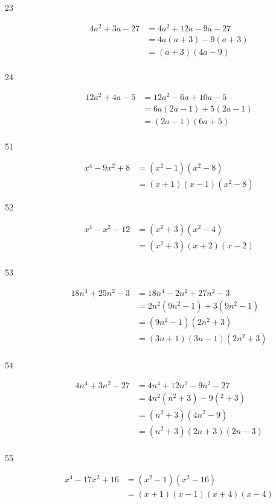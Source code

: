 \documentclass[fleqn,addpoints]{exam}
\begin{document}
\begin{description}
\item[23]
\begin{align*}
  4a^2 + 3a - 27 &= 4a^2 + 12a - 9a - 27 \\
  &= 4a(a + 3) - 9(a + 3) \\
  &= (a + 3)(4a - 9) \\
\end{align*}

\item[24]
\begin{align*}
  12a^2 + 4a - 5 &= 12a^2 - 6a + 10a - 5 \\
  &= 6a(2a - 1) + 5(2a - 1) \\
  &= (2a - 1)(6a + 5) \\  
\end{align*}


\item[51]
\begin{align*}
  x^4 - 9x^2 + 8 &= (x^2 - 1)(x^2 - 8) \\
  & = (x + 1)(x - 1)(x^2 - 8) 
\end{align*}

\item[52]
\begin{align*}
  x^4 - x^2 - 12 &= (x^2 + 3)(x^2 - 4) \\
  &= (x^2 + 3)(x + 2)(x - 2) \\
\end{align*}

\item[53]
\begin{align*}
  18n^4 + 25n^2 - 3 &= 18n^4 - 2n^2 + 27n^2 - 3 \\
  &= 2n^2(9n^2 - 1) + 3(9n^2 - 1) \\
  &= (9n^2 - 1)(2n^2 + 3) \\
  &= (3n + 1)(3n - 1)(2n^2 + 3) \\  
\end{align*}

\item[54]
\begin{align*}
  4n^4 + 3n^2 - 27 &= 4n^4 + 12n^2 - 9n^2 - 27 \\
  &= 4n^2(n^2 + 3) - 9(^2 + 3) \\
  &= (n^2 + 3)(4n^2 - 9) \\
  &= (n^2 + 3)(2n + 3)(2n - 3) \\
\end{align*}

\item[55]
\begin{align*}
  x^4 - 17x^2 + 16 &= (x^2 - 1)(x^2 - 16) \\
  &= (x + 1)(x - 1)(x + 4)(x - 4) \\
\end{align*}

\end{description}
\end{document}
